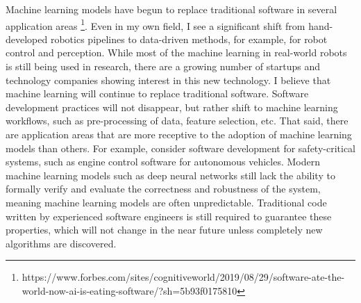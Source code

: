 \documentclass[11pt]{article}
\begin{document}
\noindent Machine learning models have begun to replace traditional software in several application areas \footnote{https://www.forbes.com/sites/cognitiveworld/2019/08/29/software-ate-the-world-now-ai-is-eating-software/?sh=5b93f0175810}. Even in my own field, I see a significant shift from hand-developed robotics pipelines to data-driven methods, for example, for robot control and perception. While most of the machine learning in real-world robots is still being used in research, there are a growing number of startups and technology companies showing interest in this new technology. I believe that machine learning will continue to replace traditional software. Software development practices will not disappear, but rather shift to machine learning workflows, such as pre-processing of data, feature selection, etc. That said, there are application areas that are more receptive to the adoption of machine learning models than others. For example, consider software development for safety-critical systems, such as engine control software for autonomous vehicles. Modern machine learning models such as deep neural networks still lack the ability to formally verify and evaluate the correctness and robustness of the system, meaning machine learning models are often unpredictable. Traditional code written by experienced software engineers is still required to guarantee these properties, which will not change in the near future unless completely new algorithms are discovered.\\
\end{document}
